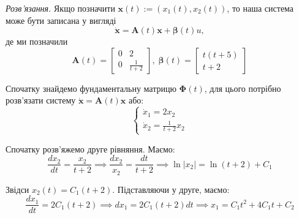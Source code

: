\documentclass[oneside,solution]{karazin-control-assign}
\begin{document}
\textit{Розв'язання.} Якщо позначити $\mathbf{x}(t) := (x_1(t),x_2(t))$, то наша система може бути записана у вигляді
\begin{equation}
    \dot{\mathbf{x}} = \boldsymbol{A}(t)\mathbf{x} + \boldsymbol{\beta}(t)u,
\end{equation}
де ми позначили
\begin{equation}
    \boldsymbol{A}(t) = \begin{bmatrix}
        0 & 2 \\
        0 & \frac{1}{t+2}
    \end{bmatrix}, \; \boldsymbol{\beta}(t) = \begin{bmatrix}
        t(t+5) \\ t+2
    \end{bmatrix}
\end{equation}

Спочатку знайдемо фундаментальну матрицю $\boldsymbol{\Phi}(t)$, для цього потрібно розв'язати систему $\dot{\mathbf{x}} = \boldsymbol{A}(t)\mathbf{x}$ або:
\begin{equation}
    \begin{cases}
        \dot{x}_1 = 2x_2 \\
        \dot{x}_2 = \frac{1}{t+2}x_2
    \end{cases}
\end{equation}

Спочатку розв'яжемо друге рівняння. Маємо:
\begin{equation}
    \frac{dx_2}{dt} = \frac{x_2}{t+2} \implies \frac{dx_2}{x_2} = \frac{dt}{t+2} \implies \ln |x_2| = \ln (t+2) + C_1
\end{equation}

Звідси $x_2(t) = C_1(t+2)$. Підставляючи у друге, маємо:
\begin{equation}
    \frac{dx_1}{dt} = 2C_1(t+2) \implies dx_1 = 2C_1(t+2)dt \implies x_1 = C_1t^2 + 4C_1t + C_2 
\end{equation}
\end{document}
